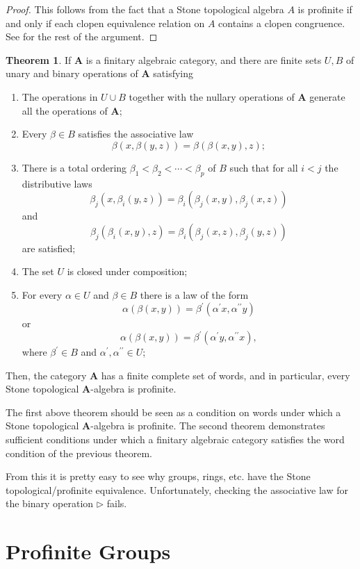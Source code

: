 \documentclass[reqno,dvipsnames]{amsart}
\let\bg\boldsymbol
\newcommand{\p}{\prime}
\newcommand{\pp}{{\prime\prime}}
\renewcommand{\a}{\alpha}
\renewcommand{\b}{\beta}
\newcommand{\tr}{\triangleright}
\theoremstyle{definition}
\newtheorem{theorem}{Theorem}[section]
\begin{document}
{\begin{proof}
This follows from the fact that a Stone topological algebra $A$ is profinite if and only if each clopen equivalence relation on $A$ contains a clopen congruence. See \cite[Theorem 2.8]{johnstone1982stone} for the rest of the argument.
\end{proof}

\begin{theorem}
If $\bg{A}$ is a finitary algebraic category, and there are finite sets $U,B$ of unary and binary operations of $\bg{A}$ satisfying
\begin{enumerate}[label=(\roman*)]
    \item The operations in $U\cup B$ together with the nullary operations of $\bg{A}$ generate all the operations of $\bg{A}$;
    \item Every $\b\in B$ satisfies the associative law
    \[\b(x,\b(y,z))=\b(\b(x,y),z);\]
    \item There is a total ordering $\b_1<\b_2<\cdots<\b_p$ of $B$ such that for all $i<j$ the distributive laws
    \[\b_j(x,\b_i(y,z))=\b_i(\b_j(x,y),\b_j(x,z))\] 
    and
    \[\b_j(\b_i(x,y),z)=\b_i(\b_j(x,z),\b_j(y,z))\]
    are satisfied;
    \item The set $U$ is closed under composition;
    \item For every $\a\in U$ and $\b\in B$ there is a law of the form
    \[\a(\b(x,y))=\b^\p(\a^\p x,\a^\pp y)\]
    or
    \[\a(\b(x,y))=\b^\p(\a^\p y,\a^\pp x),\]
    where $\b^\p\in B$ and $\a^\p,\a^\pp\in U$;
\end{enumerate}
Then, the category $\bg{A}$ has a finite complete set of words, and in particular, every Stone topological $\bg{A}$-algebra is profinite.
\end{theorem}

The first above theorem should be seen as a condition on words under which a Stone topological $\bg{A}$-algebra is profinite. The second theorem demonstrates sufficient conditions under which a finitary algebraic category satisfies the word condition of the previous theorem.

From this it is pretty easy to see why groups, rings, etc. have the Stone topological/profinite equivalence. Unfortunately, checking the associative law for the binary operation $\tr$ fails.

\newpage

\section{Profinite Groups}

}
\end{document}
